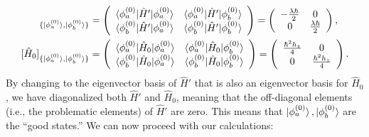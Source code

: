 \documentclass[10pt]{article}
\newcommand{\1}{\mathbf 1}
\begin{document}
\begin{align}
	[\hat H']_{\{\ket{\phi_a^{(0)}},\ket{\phi_b^{(0)}}\}}
	&=
	\left(
		\begin{array}{cc}
			\braket{\phi_a^{(0)} | \hat H' | \phi_a^{(0)}} & \braket{\phi_a^{(0)} | \hat H' | \phi_b^{(0)}}\\
			\braket{\phi_b^{(0)} | \hat H' | \phi_a^{(0)}} & \braket{\phi_b^{(0)} | \hat H' | \phi_b^{(0)}}
		\end{array}
	\right)
	=
	\left(
\begin{array}{cc}
- \frac{\lambda\hbar}{2} & 0\\
0 & \frac{\lambda \hbar}{2}
\end{array}
\right),
\\
[\hat H_0]_{\{\ket{\phi_a^{(0)}},\ket{\phi_b^{(0)}}\}}
&=
\left(
	\begin{array}{cc}
		\braket{\phi_a^{(0)} | \hat H_0 | \phi_a^{(0)}} & \braket{\phi_a^{(0)} | \hat H_0 | \phi_b^{(0)}}\\
		\braket{\phi_b^{(0)} | \hat H_0 | \phi_a^{(0)}} & \braket{\phi_b^{(0)} | \hat H_0 | \phi_b^{(0)}}
	\end{array}
\right)
=
\left(
\begin{array}{cc}
	\frac{\hbar^2h_z}{4} & 0\\
	0 & \frac{\hbar^2h_z}{4}\\
\end{array}
\right).
\end{align}
By changing to the eigenvector basis of $\hat H'$ that is also an eigenvector basis for $\hat H_0$, we have diagonalized both $\hat H'$ and $\hat H_0$, meaning that the off-diagonal elements (i.e., the problematic elements) of $\hat H'$ are zero.
This means that $\ket{\phi_a^{(0)}},\ket{\phi_b^{(0)}}$ are the ``good states.''
We can now proceed with our calculations:
\end{document}
